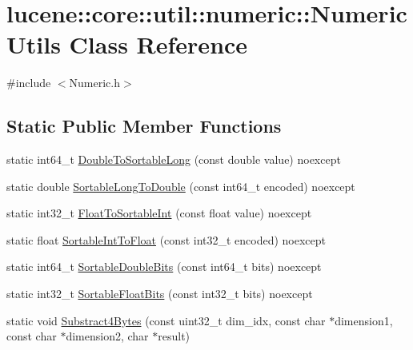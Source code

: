\hypertarget{classlucene_1_1core_1_1util_1_1numeric_1_1NumericUtils}{}\section{lucene\+:\+:core\+:\+:util\+:\+:numeric\+:\+:Numeric\+Utils Class Reference}
\label{classlucene_1_1core_1_1util_1_1numeric_1_1NumericUtils}


{\ttfamily \#include $<$Numeric.\+h$>$}

\subsection*{Static Public Member Functions}
\begin{DoxyCompactItemize}
\item 
static int64\+\_\+t \mbox{\hyperlink{classlucene_1_1core_1_1util_1_1numeric_1_1NumericUtils_a9d5b85182616a66411692490ad456292}{Double\+To\+Sortable\+Long}} (const double value) noexcept
\item 
static double \mbox{\hyperlink{classlucene_1_1core_1_1util_1_1numeric_1_1NumericUtils_ae1b4379e1894fbf903e7d9a32f60cfcc}{Sortable\+Long\+To\+Double}} (const int64\+\_\+t encoded) noexcept
\item 
static int32\+\_\+t \mbox{\hyperlink{classlucene_1_1core_1_1util_1_1numeric_1_1NumericUtils_acf9712f39d7888ce95931e2ca90ac0a5}{Float\+To\+Sortable\+Int}} (const float value) noexcept
\item 
static float \mbox{\hyperlink{classlucene_1_1core_1_1util_1_1numeric_1_1NumericUtils_a28ea95985c9845332a4c5dee3bd559b1}{Sortable\+Int\+To\+Float}} (const int32\+\_\+t encoded) noexcept
\item 
static int64\+\_\+t \mbox{\hyperlink{classlucene_1_1core_1_1util_1_1numeric_1_1NumericUtils_aed056d568ae97a28d65df1b95601e6b7}{Sortable\+Double\+Bits}} (const int64\+\_\+t bits) noexcept
\item 
static int32\+\_\+t \mbox{\hyperlink{classlucene_1_1core_1_1util_1_1numeric_1_1NumericUtils_a8f3be7673ea25e688d9890326b5f54f0}{Sortable\+Float\+Bits}} (const int32\+\_\+t bits) noexcept
\item 
static void \mbox{\hyperlink{classlucene_1_1core_1_1util_1_1numeric_1_1NumericUtils_adc8172d03864cf97fc6a266fdb425773}{Substract4\+Bytes}} (const uint32\+\_\+t dim\+\_\+idx, const char $\ast$dimension1, const char $\ast$dimension2, char $\ast$result)
\item 

\end{DoxyCompactItemize}
